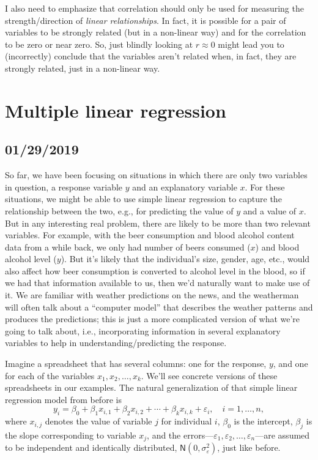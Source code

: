 \documentclass[a4paper, 12pt]{article}
\theoremstyle{plain}
\theoremstyle{definition}
\theoremstyle{remark}
\newcommand{\eps}{\varepsilon}
\newcommand{\nm}{\mathsf{N}}
\begin{document}
I also need to emphasize that correlation should only be used for measuring the strength/direction of {\em linear relationships}.  In fact, it is possible for a pair of variables to be strongly related (but in a non-linear way) and for the correlation to be zero or near zero.  So, just blindly looking at $r \approx 0$ might lead you to (incorrectly) conclude that the variables aren't related when, in fact, they are strongly related, just in a non-linear way.  





\section{Multiple linear regression}

\subsection*{01/29/2019}

So far, we have been focusing on situations in which there are only two variables in question, a response variable $y$ and an explanatory variable $x$.  For these situations, we might be able to use simple linear regression to capture the relationship between the two, e.g., for predicting the value of $y$ and a value of $x$.  But in any interesting real problem, there are likely to be more than two relevant variables.  For example, with the beer consumption and blood alcohol content data from a while back, we only had number of beers consumed ($x$) and blood alcohol level ($y$).  But it's likely that the individual's size, gender, age, etc., would also affect how beer consumption is converted to alcohol level in the blood, so if we had that information available to us, then we'd naturally want to make use of it.  We are familiar with weather predictions on the news, and the weatherman will often talk about a ``computer model'' that describes the weather patterns and produces the predictions; this is just a more complicated version of what we're going to talk about, i.e., incorporating information in several explanatory variables to help in understanding/predicting the response.  

Imagine a spreadsheet that has several columns: one for the response, $y$, and one for each of the variables $x_1, x_2, \ldots, x_k$.  We'll see concrete versions of these spreadsheets in our examples.  The natural generalization of that simple linear regression model from before is 
\[ y_i = \beta_0 + \beta_1 x_{i,1} + \beta_2 x_{i,2} + \cdots + \beta_k x_{i,k} + \eps_i, \quad i=1,\ldots,n, \]
where $x_{i,j}$ denotes the value of variable $j$ for individual $i$, $\beta_0$ is the intercept, $\beta_j$ is the slope corresponding to variable $x_j$, and the errors---$\eps_1,\eps_2,\ldots,\eps_n$---are assumed to be independent and identically distributed, $\nm(0,\sigma_\eps^2)$, just like before.  
\end{document}
